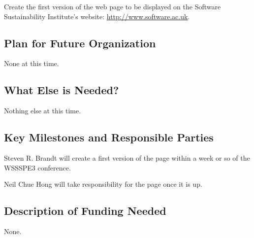 Create the first version of the web page to be displayed on the Software
Sustainability Institute's website: \url{http://www.software.ac.uk}.

\subsection{Plan for Future Organization}

None at this time.

\subsection{What Else is Needed?}

Nothing else at this time.

\subsection{Key Milestones and Responsible Parties}

Steven R. Brandt will create a first version of the page within a week or so of
the WSSSPE3 conference.

Neil Chue Hong will take responsibility for the page once it is up.

\subsection{Description of Funding Needed}

None.
